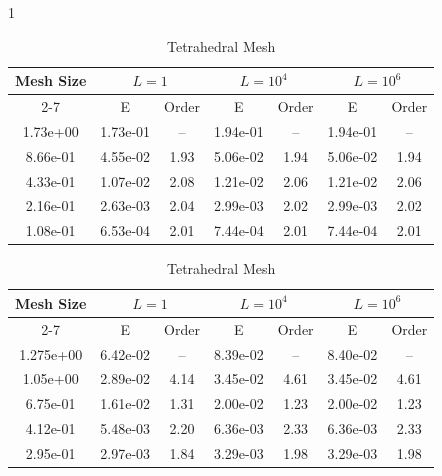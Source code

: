 \documentclass[a4paper,11pt]{article}
\theoremstyle{definition}
\theoremstyle{remark}
\begin{document}
\begin{table}[ht]
\centering
\begin{subtable}{1\textwidth}
\centering
\scriptsize
\begin{tabular}{|c|c|c|c|c|c|c|}
\hline
\multirow{2}{*}{Mesh Size} & \multicolumn{2}{|c|}{$L=1$} & \multicolumn{2}{|c|}{$L=10^4$}& \multicolumn{2}{|c|}{$L=10^6$} \\ \cline{2-7}
& E & Order & E& Order& E& Order \\ \hline
1.73e+00 & 1.73e-01 & -- & 1.94e-01 & -- & 1.94e-01 & -- \\ \hline
8.66e-01 & 4.55e-02 & 1.93 & 5.06e-02 & 1.94 & 5.06e-02 & 1.94 \\ \hline
4.33e-01 & 1.07e-02 & 2.08 & 1.21e-02  & 2.06 & 1.21e-02 & 2.06 \\ \hline
2.16e-01 & 2.63e-03 & 2.04 & 2.99e-03 & 2.02 & 2.99e-03 & 2.02 \\ \hline
1.08e-01 & 6.53e-04 & 2.01 & 7.44e-04 & 2.01 & 7.44e-04 & 2.01 \\ \hline
\end{tabular}
\caption{Cartesian Mesh}
\end{subtable}

\vspace{1em}

\begin{subtable}{\textwidth}
\centering
\scriptsize
\begin{tabular}{|c|c|c|c|c|c|c|}
\hline
\multirow{2}{*}{Mesh Size} & \multicolumn{2}{|c|}{$L=1$} & \multicolumn{2}{|c|}{$L=10^4$}& \multicolumn{2}{|c|}{$L=10^6$} \\ \cline{2-7}
                             & E & Order & E& Order& E& Order \\ \hline
1.275e+00 & 6.42e-02 & -- & 8.39e-02 & -- & 8.40e-02 & -- \\ \hline
1.05e+00 & 2.89e-02 & 4.14 & 3.45e-02 & 4.61 & 3.45e-02 & 4.61 \\ \hline
6.75e-01 & 1.61e-02 & 1.31 & 2.00e-02  & 1.23 & 2.00e-02 & 1.23 \\ \hline
4.12e-01 & 5.48e-03 & 2.20 & 6.36e-03 & 2.33 & 6.36e-03  & 2.33 \\ \hline
2.95e-01  & 2.97e-03 & 1.84 & 3.29e-03 & 1.98 & 3.29e-03 & 1.98 \\ \hline
\end{tabular}
\caption{Tetrahedral Mesh}
\end{subtable}

\vspace{1em}


\end{table}
\end{document}
